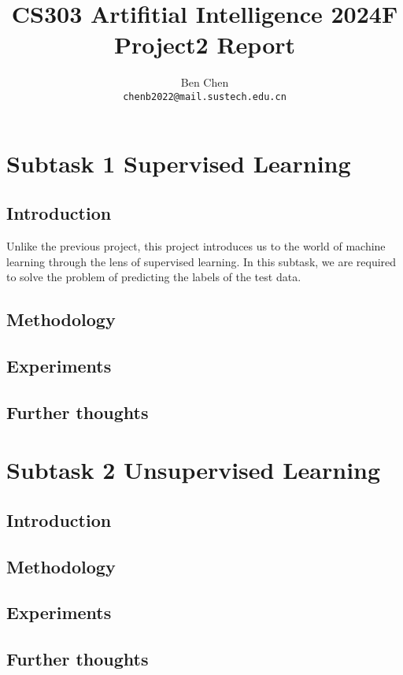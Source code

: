 \documentclass{article}
\title{\textbf{CS303 Artifitial Intelligence 2024F Project2 Report}}
\author{Ben Chen \\ \texttt{chenb2022@mail.sustech.edu.cn}}
\begin{document}
\maketitle

\section{Subtask 1 Supervised Learning}

\subsection{Introduction}

Unlike the previous project, this project introduces us to the world of machine learning through the lens of supervised learning. In this subtask, we are required to solve the problem of predicting the labels of the test data. 

\subsection{Methodology}

\subsection{Experiments}

\subsection{Further thoughts}

\section{Subtask 2 Unsupervised Learning}

\subsection{Introduction}

\subsection{Methodology}

\subsection{Experiments}

\subsection{Further thoughts}
\end{document}
